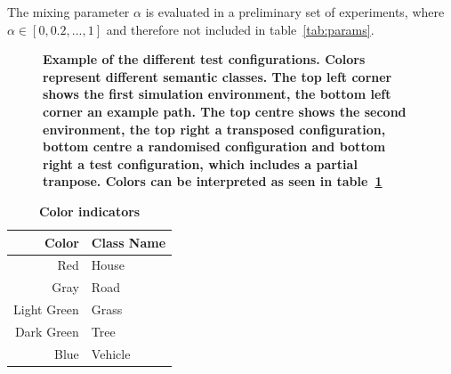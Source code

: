 \documentclass[twocolumn,letterpaper]{IEEEAerospaceCLS}  %
\begin{document}
The mixing parameter $\alpha$ is evaluated in a preliminary set of experiments, where $\alpha \in [0, 0.2, ..., 1]$ and therefore not included in table~\ref{tab:params}. 
\begin{figure}[]
    \centering
    \caption{\bf{
        Example of the different test configurations. Colors represent different semantic classes. The top left corner shows the first simulation environment, the bottom left corner an example path. The top centre shows the second environment, the top right a transposed configuration, bottom centre a randomised configuration and bottom right a test configuration, which includes a partial tranpose. Colors can be interpreted as seen in table~\ref{tab:colors}
    }}
    \label{fig:SimCase}
\end{figure}
\begin{table}[]
    \renewcommand{\arraystretch}{1.3}
    \caption{\bf Color indicators}
    \label{tab:colors}
    \centering
    \begin{tabular}{|r||l|}
        \hline
        \bfseries Color      & \bfseries Class Name    \\
        \hline \hline
        Red &  House\\
        \hline
        Gray  & Road         \\
        \hline
        Light Green     & Grass              \\
        \hline
        Dark Green & Tree           \\
        \hline
        Blue & Vehicle \\
        \hline
    \end{tabular}
\end{table}
\end{document}
